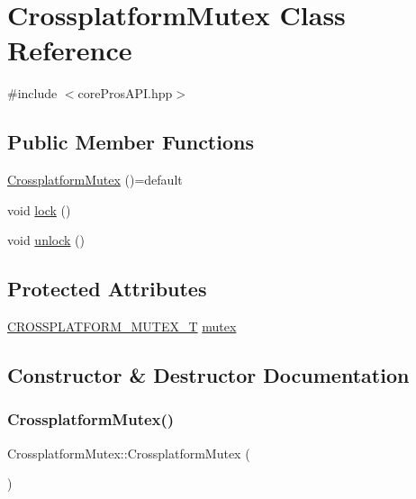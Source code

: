\hypertarget{classCrossplatformMutex}{}\section{Crossplatform\+Mutex Class Reference}
\label{classCrossplatformMutex}


{\ttfamily \#include $<$core\+Pros\+A\+P\+I.\+hpp$>$}

\subsection*{Public Member Functions}
\begin{DoxyCompactItemize}
\item 
\mbox{\hyperlink{classCrossplatformMutex_a49aa408897e0305f01a125fe7e2d38a0}{Crossplatform\+Mutex}} ()=default
\item 
void \mbox{\hyperlink{classCrossplatformMutex_a2635624ac3a8b54763943ce380cbc6bd}{lock}} ()
\item 
void \mbox{\hyperlink{classCrossplatformMutex_a511077dffa768ad86587eed07a1e51e0}{unlock}} ()
\end{DoxyCompactItemize}
\subsection*{Protected Attributes}
\begin{DoxyCompactItemize}
\item 
\mbox{\hyperlink{coreProsAPI_8hpp_a2d31e6e2814843325d883d86f93e8663}{C\+R\+O\+S\+S\+P\+L\+A\+T\+F\+O\+R\+M\+\_\+\+M\+U\+T\+E\+X\+\_\+T}} \mbox{\hyperlink{classCrossplatformMutex_ab89a271155254b137ca809dd62081ab4}{mutex}}
\end{DoxyCompactItemize}


\subsection{Constructor \& Destructor Documentation}
\mbox{\label{classCrossplatformMutex_a49aa408897e0305f01a125fe7e2d38a0}} 
\subsubsection{\texorpdfstring{CrossplatformMutex()}{CrossplatformMutex()}}
{\footnotesize\ttfamily Crossplatform\+Mutex\+::\+Crossplatform\+Mutex (\begin{DoxyParamCaption}{ }\end{DoxyParamCaption})\hspace{0.3cm}{\ttfamily [default]}}




